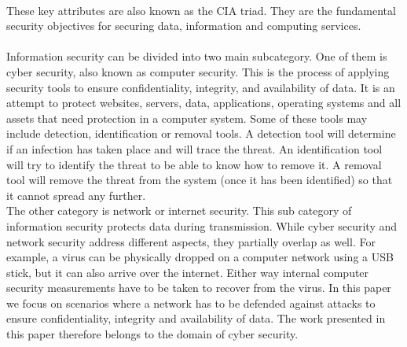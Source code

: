  ~~\\
 These key attributes are also known as the CIA triad. They are the fundamental security objectives for securing data, information and computing services. \\
 \\
Information security can be divided into two main subcategory. One of them is cyber security, also known as computer security. This is the process of applying security tools to ensure confidentiality, integrity, and availability of data. It is an attempt to protect websites, servers, data, applications, operating systems and all assets that need protection in a computer system.  Some of these tools may include detection, identification or removal tools. A detection tool will determine if an infection has taken place and will trace the threat. An identification tool will try to identify the threat to be able to know how to remove it. A removal tool will remove the threat from the system (once it has been identified) so that it cannot spread any further. \\
The other category is network or internet security. This sub category of information security protects data during transmission. While cyber security and network security address different aspects, they partially overlap as well. For example, a virus can be physically dropped on a computer network using a USB stick, but it can also arrive over the internet. Either way internal computer security measurements have to be taken to recover from the virus. In this paper we focus on scenarios where a network has to be defended against attacks to ensure confidentiality, integrity and availability of data. The work presented in this paper therefore belongs to the domain of cyber security.




